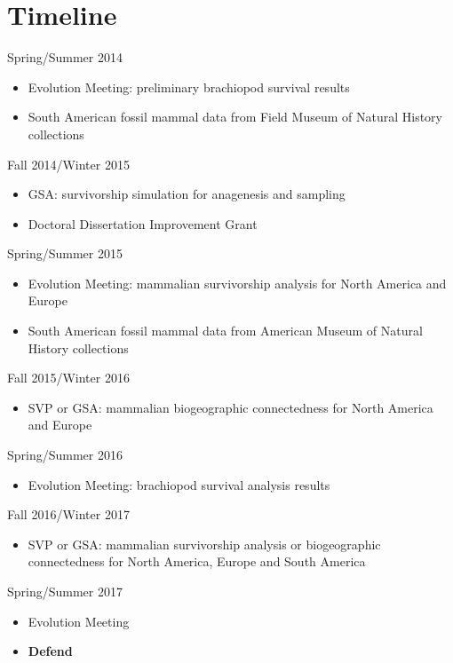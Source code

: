 \documentclass[12pt,letterpaper]{article}
\begin{document}
\clearpage
\section{Timeline}

Spring/Summer 2014
\begin{itemize}
  \item Evolution Meeting: preliminary brachiopod survival results
  \item South American fossil mammal data from Field Museum of Natural History collections
\end{itemize}

Fall 2014/Winter 2015
\begin{itemize}
  \item GSA: survivorship simulation for anagenesis and sampling
  \item Doctoral Dissertation Improvement Grant
\end{itemize}

Spring/Summer 2015
\begin{itemize}
  \item Evolution Meeting: mammalian survivorship analysis for North America and Europe
  \item South American fossil mammal data from American Museum of Natural History collections
\end{itemize}

Fall 2015/Winter 2016
\begin{itemize}
  \item SVP or GSA: mammalian biogeographic connectedness for North America and Europe
\end{itemize}

Spring/Summer 2016
\begin{itemize}
  \item Evolution Meeting: brachiopod survival analysis results
\end{itemize}

Fall 2016/Winter 2017
\begin{itemize}
  \item SVP or GSA: mammalian survivorship analysis or biogeographic connectedness for North America, Europe and South America
\end{itemize}

Spring/Summer 2017
\begin{itemize}
  \item Evolution Meeting
  \item \textbf{Defend}
\end{itemize}



\clearpage


\end{document}
